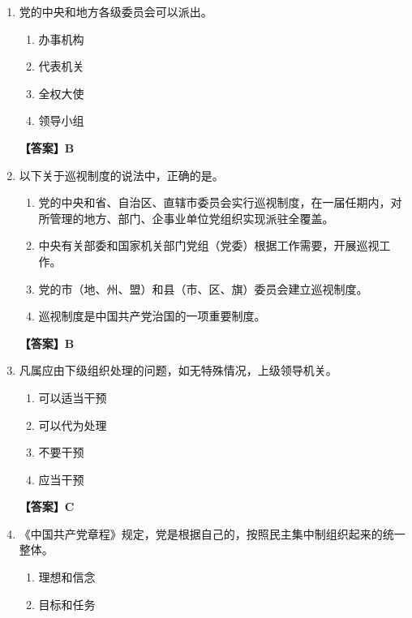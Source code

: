\documentclass[UTF8,11pt,a4paper]{ctexart}
\begin{document}
\begin{enumerate}[label=\textbf{\arabic*.}, leftmargin=2.5em, itemsep=0.7em]
\begin{enumerate}[label=\Alph*., leftmargin=2em, itemsep=0.1em, topsep=0.15em]
\item 下级服从上级
\item 集体利益优先
\end{enumerate}
\textbf{【答案】B}
\item 党的中央和地方各级委员会可以派出\allowbreak\underline{\hspace{4em}}。
\begin{enumerate}[label=\Alph*., leftmargin=2em, itemsep=0.1em, topsep=0.15em]
\item 办事机构
\item 代表机关
\item 全权大使
\item 领导小组
\end{enumerate}
\textbf{【答案】B}
\item 以下关于巡视制度的说法中，正确的是\allowbreak\underline{\hspace{4em}}。
\begin{enumerate}[label=\Alph*., leftmargin=2em, itemsep=0.1em, topsep=0.15em]
\item 党的中央和省、自治区、直辖市委员会实行巡视制度，在一届任期内，对所管理的地方、部门、企事业单位党组织实现派驻全覆盖。
\item 中央有关部委和国家机关部门党组（党委）根据工作需要，开展巡视工作。
\item 党的市（地、州、盟）和县（市、区、旗）委员会建立巡视制度。
\item 巡视制度是中国共产党治国的一项重要制度。
\end{enumerate}
\textbf{【答案】B}
\item 凡属应由下级组织处理的问题，如无特殊情况，上级领导机关\allowbreak\underline{\hspace{4em}}。
\begin{enumerate}[label=\Alph*., leftmargin=2em, itemsep=0.1em, topsep=0.15em]
\item 可以适当干预
\item 可以代为处理
\item 不要干预
\item 应当干预
\end{enumerate}
\textbf{【答案】C}
\item 《中国共产党章程》规定，党是根据自己的\allowbreak\underline{\hspace{4em}}，按照民主集中制组织起来的统一整体。
\begin{enumerate}[label=\Alph*., leftmargin=2em, itemsep=0.1em, topsep=0.15em]
\item 理想和信念
\item 目标和任务

\end{enumerate}
\end{enumerate}
\end{document}
